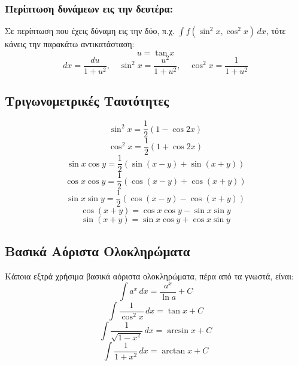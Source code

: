 \documentclass[a4paper,12pt]{article}
\begin{document}
\subsubsection*{Περίπτωση δυνάμεων εις την δευτέρα:}
Σε περίπτωση που έχεις δύναμη εις την δύο, π.χ. $\int f(\sin^2 x, \cos^2 x)\,dx$, τότε κάνεις την παρακά\-τω αντικατάσταση:
\[
u = \tan x
\]
\[
dx = \frac{du}{1+u^2}, \quad \sin^2 x = \frac{u^2}{1+u^2}, \quad \cos^2 x = \frac{1}{1+u^2}
\]

\subsection*{Τριγωνομετρικές Ταυτότητες}
\[
\sin^2 x = \frac{1}{2}(1-\cos 2x)
\]
\[
\cos^2 x = \frac{1}{2}(1+\cos 2x)
\]
\[
\sin x \cos y = \frac{1}{2}(\sin(x-y) + \sin(x+y))
\]
\[
\cos x \cos y = \frac{1}{2}(\cos(x-y) + \cos(x+y))
\]
\[
\sin x \sin y = \frac{1}{2}(\cos(x-y) - \cos(x+y))
\]
\[
\cos(x+y) = \cos x \cos y - \sin x \sin y
\]
\[
\sin(x+y) = \sin x \cos y + \cos x \sin y
\]

\subsection*{Βασικά Αόριστα Ολοκληρώματα}
Κάποια εξτρά χρήσιμα βασικά αόριστα ολοκληρώματα, πέρα από τα γνωστά, είναι:
\[
\int a^x\,dx = \frac{a^x}{\ln a} + C
\]
\[
\int \frac{1}{\cos^2 x}\,dx = \tan x + C
\]
\[
\int \frac{1}{\sqrt{1-x^2}}\,dx = \arcsin x + C
\]
\[
\int \frac{1}{1+x^2}\,dx = \arctan x + C
\]
\end{document}

